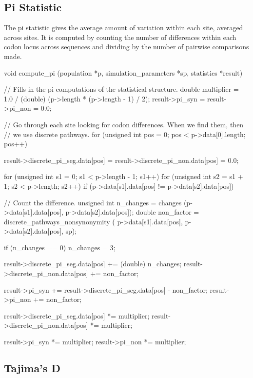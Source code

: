 \documentclass{article}
\begin{document}
    \subsection{Pi Statistic}
      \label{sec:pi-statistic}

      The pi statistic gives the average amount of variation within each site,
      averaged across sites. It is computed by counting the number of
      differences within each codon locus across sequences and dividing by the
      number of pairwise comparisons made.

\begin{ccode}
void compute_pi (population *p, simulation_parameters *sp, statistics *result) {
  // Fills in the pi computations of the statistical structure.
  double multiplier = 1.0 / (double) (p->length * (p->length - 1) / 2);
  result->pi_syn = result->pi_non = 0.0;

  // Go through each site looking for codon differences. When we find them, then
  // we use discrete pathways.
  for (unsigned int pos = 0; pos < p->data[0].length; pos++) {
    result->discrete_pi_seg.data[pos] =
      result->discrete_pi_non.data[pos] = 0.0;

    for (unsigned int s1 = 0; s1 < p->length - 1; s1++)
      for (unsigned int s2 = s1 + 1; s2 < p->length; s2++)
	if (p->data[s1].data[pos] != p->data[s2].data[pos]) {
	  // Count the difference.
	  unsigned int	n_changes  = changes (p->data[s1].data[pos], p->data[s2].data[pos]);
	  double	non_factor = discrete_pathways_nonsynonymity (
	    p->data[s1].data[pos], p->data[s2].data[pos], sp);

	  if (n_changes == 0) n_changes = 3;

	  result->discrete_pi_seg.data[pos] += (double) n_changes;
	  result->discrete_pi_non.data[pos] += non_factor;

	  result->pi_syn += result->discrete_pi_seg.data[pos] - non_factor;
	  result->pi_non += non_factor;
	}

    result->discrete_pi_seg.data[pos] *= multiplier;
    result->discrete_pi_non.data[pos] *= multiplier;
  }

  result->pi_syn *= multiplier;
  result->pi_non *= multiplier;
}
\end{ccode}

    \subsection{Tajima's D}
      \label{sec:d-statistic}
\end{document}
